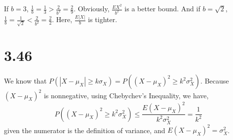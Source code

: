 \documentclass[letter]{article}
\begin{document}
   If $b=3$, $\frac{1}{b} = \frac{1}{3} > \frac{2}{b^2} = \frac{2}{9}$. Obviously, $\frac{EX^2}{b^2}$ is a better bound. And if $b = \sqrt{2}$, $\frac{1}{b} = \frac{1}{\sqrt{2}} < \frac{2}{b^2} = \frac{2}{2}$. Here, $\frac{E|X|}{b}$ is tighter.

   \section*{3.46}
    We know that $P(|X-\mu_X| \ge k\sigma_X) = P\left((X-\mu_X)^2 \ge k^2 \sigma_X^2\right)$. Because $(X-\mu_X)^2$ is nonnegative, using Chebychev's Inequality, we have,
    \[
    P\left((X-\mu_X)^2 \ge k^2 \sigma_X^2\right) \le \frac{E(X-\mu_X)^2}{k^2 \sigma_X^2} = \frac{1}{k^2}
    \]
    given the numerator is the definition of variance, and $E(X - \mu_X)^2 = \sigma_X^2$.
    
    
\end{document}
